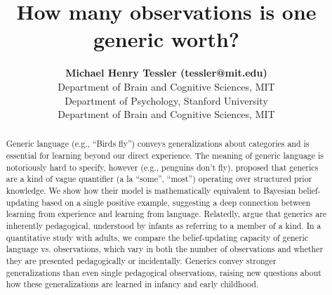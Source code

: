 \documentclass[10pt,letterpaper]{article}
\title{How many observations is one generic worth?}
\author{{\large \bf Michael Henry Tessler (tessler@mit.edu)} \\
  Department of Brain and Cognitive Sciences, MIT
  \AND {\large \bf Sophie Bridgers (sbridge@stanford.edu)} \\
  Department of Psychology,  Stanford University
    \AND {\large \bf  Joshua B. Tenenbaum (jbt@mit.edu)} \\
  Department of Brain and Cognitive Sciences, MIT
  }
\begin{document}
\maketitle


\begin{abstract}

Generic language (e.g., ``Birds fly'') conveys generalizations about categories and is essential for learning beyond our direct experience. The meaning of generic language is notoriously hard to specify, however (e.g., penguins don't fly).  proposed that generics are a kind of vague quantifier (a la ``some'', ``most'') operating over structured prior knowledge. We show how their model is mathematically equivalent to Bayesian belief-updating based on a single positive example, suggesting a deep connection between learning from experience and learning from language. Relatedly,  argue that generics are inherently pedagogical, understood by infants as referring to a member of a kind. In a quantitative study with adults, we compare the belief-updating capacity of generic language vs. observations, which vary in both the number of observations and whether they are presented pedagogically or incidentally. Generics convey stronger generalizations than even single pedagogical observations, raising new questions about how these generalizations are learned in infancy and early childhood.



\end{abstract}
\end{document}
